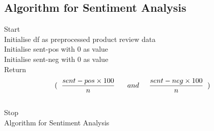 \documentclass[11pt]{report}
\begin{document}
\subsection{Algorithm for Sentiment Analysis}
\vspace{0.5cm}
\begin{algorithm}[H]
\SetAlgoLined
{}
Start \\
Initialise df as preprocessed product review data\\
Initialise sent-pos with 0 as value \\
Initialise sent-neg with 0 as value\\
Return\[ ( \hspace{0.2cm} \frac{sent-pos \times 100}{n}\ \hspace{0.5cm} and \hspace{0.5cm} \frac{sent-neg \times 100}{n} \hspace{0.2cm} )\]\\
Stop \\
\caption{Algorithm for Sentiment Analysis}
\end{algorithm}
\vspace{0.5cm}
\end{document}
